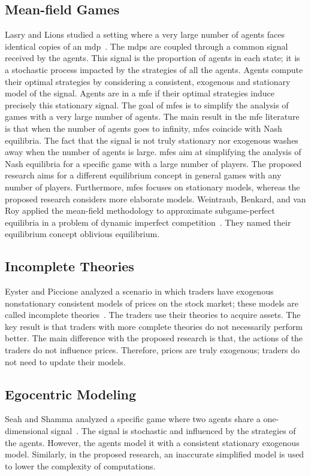 \subsection{Mean-field Games}
Lasry and Lions studied a setting where a very large number of agents faces identical copies of an \ac{mdp}~\cite{lasry_lions:2007}.
The \acp{mdp} are coupled through a common signal received by the agents.
This signal is the proportion of agents in each state; it is a stochastic process impacted by the strategies of all the agents.
Agents compute their optimal strategies by considering a consistent, exogenous and stationary model of the signal.
Agents are in a \ac{mfe} if their optimal strategies induce precisely this stationary signal.
The goal of \acp{mfe} is to simplify the analysis of games with a very large number of agents.
The main result in the \ac{mfe} literature is that when the number of agents goes to infinity, \acp{mfe} coincide with Nash equilibria.
The fact that the signal is not truly stationary nor exogenous washes away when the number of agents is large.
\acp{mfe} aim at simplifying the analysis of Nash equilibria for a specific game with a large number of players.
The proposed research aims for a different equilibrium concept in general games with any number of players.
Furthermore, \acp{mfe} focuses on stationary models, whereas the proposed research considers more elaborate models.
Weintraub, Benkard, and van Roy applied the mean-field methodology to approximate subgame-perfect equilibria in a problem of dynamic imperfect competition~\cite{weintraub_benkard_van-roy:2008}.
They named their equilibrium concept oblivious equilibrium.

\subsection{Incomplete Theories}
Eyster and Piccione analyzed a scenario in which traders have exogenous nonstationary consistent models of prices on the stock market; these models are called incomplete theories~\cite{eyster_piccione:2011}.
The traders use their theories to acquire assets.
The key result is that traders with more complete theories do not necessarily perform better.
The main difference with the proposed research is that, the actions of the traders do not influence prices.
Therefore, prices are truly exogenous; traders do not need to update their models.

\subsection{Egocentric Modeling}
Seah and Shamma analyzed a specific game where two agents share a one-dimensional signal~\cite{seah_shamma:2008}.
The signal is stochastic and influenced by the strategies of the agents.
However, the agents model it with a consistent stationary exogenous model.
Similarly, in the proposed research, an inaccurate  simplified model is used to lower the complexity of computations.
